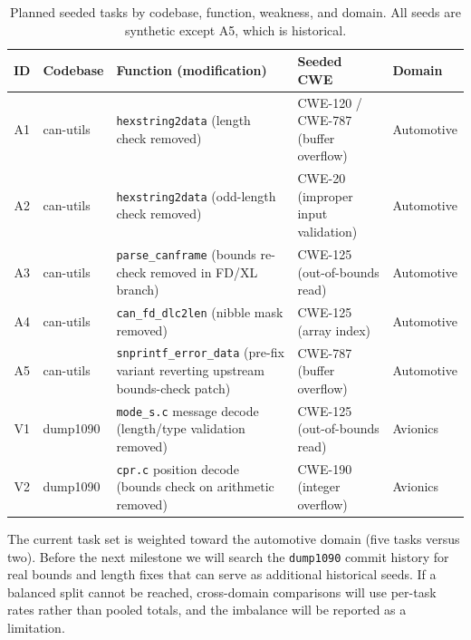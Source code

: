 \documentclass[12pt]{IEEEtran}
\begin{document}
\begin{table}[t]
    \centering
    \caption{Planned seeded tasks by codebase, function, weakness, and domain. All seeds are synthetic except A5, which is historical.}
    \label{tab:tasks}
    \begin{tabular}{|c|l|p{5.4cm}|p{4.0cm}|l|}
        \hline
        \textbf{ID} & \textbf{Codebase} & \textbf{Function (modification)} & \textbf{Seeded CWE} & \textbf{Domain} \\
        \hline
        A1 & can-utils & \texttt{hexstring2data} (length check removed) & CWE-120 / CWE-787 (buffer overflow) & Automotive \\
        \hline
        A2 & can-utils & \texttt{hexstring2data} (odd-length check removed) & CWE-20 (improper input validation) & Automotive \\
        \hline
        A3 & can-utils & \texttt{parse\_canframe} (bounds re-check removed in FD/XL branch) & CWE-125 (out-of-bounds read) & Automotive \\
        \hline
        A4 & can-utils & \texttt{can\_fd\_dlc2len} (nibble mask removed) & CWE-125 (array index) & Automotive \\
        \hline
        A5 & can-utils & \texttt{snprintf\_error\_data} (pre-fix variant reverting upstream bounds-check patch) & CWE-787 (buffer overflow) & Automotive \\
        \hline
        V1 & dump1090 & \texttt{mode\_s.c} message decode (length/type validation removed) & CWE-125 (out-of-bounds read) & Avionics \\
        \hline
        V2 & dump1090 & \texttt{cpr.c} position decode (bounds check on arithmetic removed) & CWE-190 (integer overflow) & Avionics \\
        \hline
    \end{tabular}
\end{table}

The current task set is weighted toward the automotive domain (five tasks versus two). Before the next milestone we will search the \texttt{dump1090} commit history for real bounds and length fixes that can serve as additional historical seeds. If a balanced split cannot be reached, cross-domain comparisons will use per-task rates rather than pooled totals, and the imbalance will be reported as a limitation.
\end{document}
